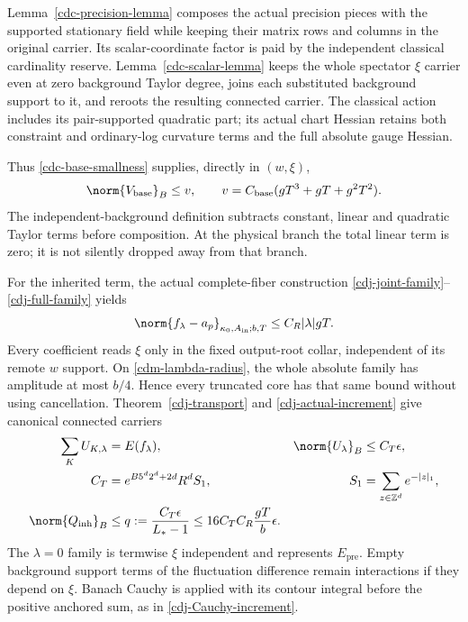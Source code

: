 Lemma~\ref{cdc-precision-lemma} composes the actual precision
pieces with the supported stationary field while keeping their
matrix rows and columns in the original carrier. Its
scalar-coordinate factor is paid by the independent classical
cardinality reserve. Lemma~\ref{cdc-scalar-lemma} keeps the
whole spectator $\xi$ carrier even at zero background Taylor
degree, joins each substituted background support to it, and
reroots the resulting connected carrier. The classical action
includes its pair-supported quadratic part; its actual chart
Hessian retains both constraint and ordinary-log curvature
terms and the full absolute gauge Hessian.

Thus \eqref{cdc-base-smallness} supplies, directly in $(w,\xi)$,
\begin{equation}
 \norm{V_{\mathrm{base}}}_B\le v,\qquad
 v=C_{\mathrm{base}}(gT^3+gT+g^2T^2).
 \label{cdm-base-bound}
\end{equation}
The independent-background definition subtracts constant,
linear and quadratic Taylor terms before composition. At the
physical branch the total linear term is zero; it is not
silently dropped away from that branch.

For the inherited term, the actual complete-fiber construction
\eqref{cdj-joint-family}--\eqref{cdj-full-family} yields
\begin{equation}
 \norm{f_\lambda-a_p}_{\kappa_0,A_{\mathrm{in}};b,T}
                 \le C_R|\lambda|gT.
 \label{cdm-actual-family}
\end{equation}
Every coefficient reads $\xi$ only in the fixed output-root
collar, independent of its remote $w$ support. On
\eqref{cdm-lambda-radius}, the whole absolute family has
amplitude at most $b/4$. Hence every truncated core has that
same bound without using cancellation.
Theorem~\ref{cdj-transport} and
\eqref{cdj-actual-increment} give canonical connected carriers
\begin{align}
 \sum_K U_{K,\lambda}&=E(f_\lambda),&
 \norm{U_\lambda}_B&\le C_T\epsilon,\notag\\
 C_T&=e^{B5^d2^d+2d}R^dS_1,&
 S_1&=\sum_{z\in\mathbb Z^d}e^{-|z|_1},\notag\\
 \norm{Q_{\mathrm{inh}}}_B
 &\le q:=\frac{C_T\epsilon}{L_*-1}
 \le16C_TC_R\frac{gT}{b}\epsilon .
 \label{cdm-inherited-bound}
\end{align}
The $\lambda=0$ family is termwise $\xi$ independent and
represents $E_{\mathrm{pre}}$. Empty background support terms
of the fluctuation difference remain interactions if they
depend on $\xi$. Banach Cauchy is applied with its contour
integral before the positive anchored sum, as in
\eqref{cdj-Cauchy-increment}.

